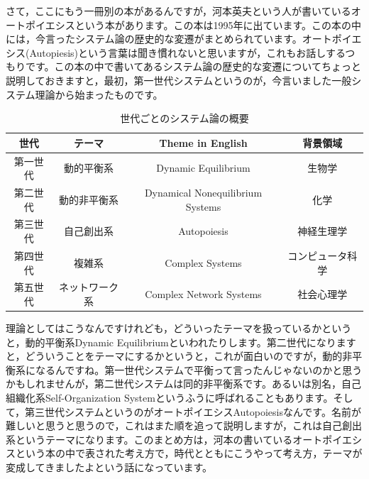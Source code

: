 \documentclass{ltjsbook}
\begin{document}
さて，ここにもう一冊別の本があるんですが，河本英夫という人が書いているオートポイエシスという本があります\parencite{KawamotoHideo}。この本は1995年に出ています。この本の中には，今言ったシステム論の歴史的な変遷がまとめられています。オートポイエシス(Autopiesis)という言葉は聞き慣れないと思いますが，これもお話しするつもりです。この本の中で書いてあるシステム論の歴史的な変遷についてちょっと説明しておきますと，最初，第一世代システムというのが，今言いました一般システム理論から始まったものです。

\begin{table}[h!]
    \centering
    \caption{世代ごとのシステム論の概要}
    \begin{tabular}{cccc}
    \hline
    世代 & テーマ & Theme in English & 背景領域  \\ \hline
    第一世代 & 動的平衡系\index[termidx]{どうてきへいこうけい@動的平衡系} & Dynamic Equilibrium & 生物学  \\ 
    第二世代 & 動的非平衡系\index[termidx]{どうてきひへいこうけい@動的非平衡系} & Dynamical Nonequilibrium Systems & 化学  \\ 
    第三世代 & 自己創出系 & Autopoiesis & 神経生理学 \\ 
    第四世代 & 複雑系\index[termidx]{ふくざつけい@複雑系} & Complex Systems & コンピュータ科学  \\ 
    第五世代 & ネットワーク系 & Complex Network Systems & 社会心理学 \\ \hline
    \end{tabular}
    \label{tab:system_generations}
\end{table}


理論としてはこうなんですけれども，どういったテーマを扱っているかというと，動的平衡系Dynamic Equilibriumといわれたりします。第二世代になりますと，どういうことをテーマにするかというと，これが面白いのですが，動的非平衡系になるんですね。第一世代システムで平衡って言ったんじゃないのかと思うかもしれませんが，第二世代システムは同的非平衡系です。あるいは別名，自己組織化系Self-Organization Systemというふうに呼ばれることもあります。そして，第三世代システムというのがオートポイエシスAutopoiesisなんです。名前が難しいと思うと思うので，これはまた順を追って説明しますが，これは自己創出系というテーマになります。このまとめ方は，河本の書いているオートポイエシスという本\parencite{KawamotoHideo}の中で表された考え方で，時代とともにこうやって考え方，テーマが変成してきましたよという話になっています。
\end{document}
